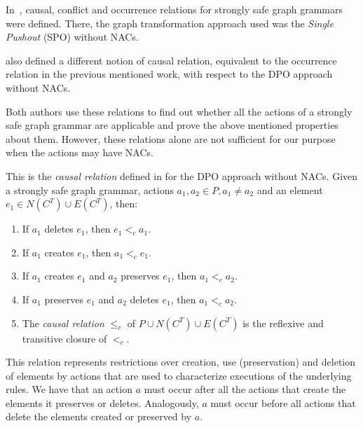 In~\cite{Ribeiro1996}, causal, conflict and occurrence relations for strongly safe graph grammars were defined. There, the graph transformation approach used was the \emph{Single Pushout} (SPO) without NACs.

\cite{Corradini1996} also defined a different notion of causal relation, equivalent to the occurrence relation in the previous mentioned work, with respect to the DPO approach without NACs.

Both authors use these relations to find out whether all the actions of a strongly safe graph grammar are applicable and prove the above mentioned properties about them. However, these relations alone are not sufficient for our purpose when the actions may have NACs.


\begin{definition} This is the \emph{causal relation} defined in \cite{Corradini1996} for the DPO approach without NACs. Given  \doublyTypedGraphGrammarCore{} a strongly safe graph grammar, actions \mbox{$a_1, a_2 \in P, a_1 \ne a_2$} and an element \mbox{$e_1 \in N(C^T) \cup E(C^T)$}, then:

  \begin{enumerate}
    \item If $a_1$ deletes $e_1$, then $e_1 <_c a_1$.
    \item If $a_1$ creates $e_1$, then $a_1 <_c e_1$.
    \item If $a_1$ creates $e_1$ and $a_2$ preserves $e_1$, then $a_1 <_c a_2$.
    \item If $a_1$ preserves $e_1$ and $a_2$ deletes $e_1$, then $a_1 <_c a_2$. 
    \item The \emph{causal relation} $\leq_c$ of $P \cup N(C^T) \cup E(C^T)$ is the reflexive and transitive closure of $<_c$.
  \end{enumerate}
\end{definition}

This relation represents restrictions over creation, use (preservation) and deletion of elements by actions that are used to characterize executions of the underlying rules. We have that an action $a$ must occur after all the actions that create the elements it preserves or deletes. Analogously, $a$ must occur before all actions that delete the elements created or preserved by $a$.

